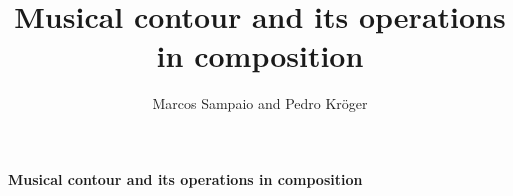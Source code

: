 \documentclass[12pt]{article}
\begin{document}
\title{Musical contour and its operations in composition}
\author{Marcos Sampaio and Pedro Kröger}

\begin{center}
  \Large \textbf{\textsf{Musical contour and its operations in composition}}
\end{center}


\thispagestyle{empty}

\doublespacing


\singlespacing



\end{document}
